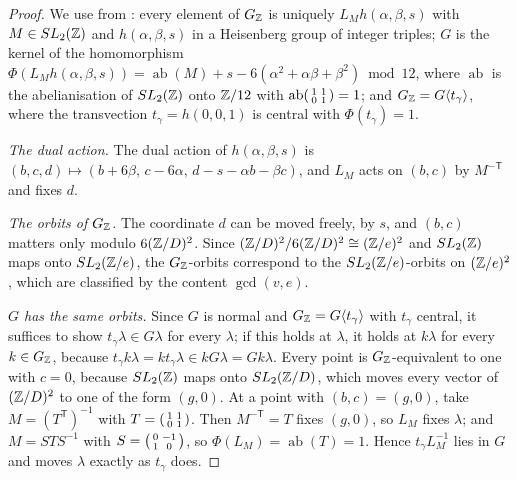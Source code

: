 \begin{proof}
We use from \cite[§§2--3]{SixSpherePaper}: every element of $G_{\mathbb{Z}}$ is uniquely $L_Mh(\alpha,\beta,s)$ with $M\in SL_2(\mathbb{Z})$ and $h(\alpha,\beta,s)$ in a Heisenberg group of integer triples; $G$ is the kernel of the homomorphism $\Phi(L_Mh(\alpha,\beta,s))=\operatorname{ab}(M)+s-6(\alpha^2+\alpha\beta+\beta^2)\bmod12$, where $\operatorname{ab}$ is the abelianisation of $SL_2(\mathbb{Z})$ onto $\mathbb{Z}/12$ with $\operatorname{ab}\begin{psmallmatrix}1&1\\0&1\end{psmallmatrix}=1$; and $G_{\mathbb{Z}}=G\langle t_\gamma\rangle$, where the transvection $t_\gamma=h(0,0,1)$ is central with $\Phi(t_\gamma)=1$.

\emph{The dual action.} The dual action of $h(\alpha,\beta,s)$ is $(b,c,d)\mapsto(b+6\beta,\,c-6\alpha,\,d-s-\alpha b-\beta c)$, and $L_M$ acts on $(b,c)$ by $M^{-\mathsf T}$ and fixes $d$.

\emph{The orbits of $G_{\mathbb{Z}}$.} The coordinate $d$ can be moved freely, by $s$, and $(b,c)$ matters only modulo $6(\mathbb{Z}/D)^2$. Since $(\mathbb{Z}/D)^2/6(\mathbb{Z}/D)^2\cong(\mathbb{Z}/e)^2$ and $SL_2(\mathbb{Z})$ maps onto $SL_2(\mathbb{Z}/e)$, the $G_{\mathbb{Z}}$-orbits correspond to the $SL_2(\mathbb{Z}/e)$-orbits on $(\mathbb{Z}/e)^2$, which are classified by the content $\gcd(v,e)$.

\emph{$G$ has the same orbits.} Since $G$ is normal and $G_{\mathbb{Z}}=G\langle t_\gamma\rangle$ with $t_\gamma$ central, it suffices to show $t_\gamma\lambda\in G\lambda$ for every $\lambda$; if this holds at $\lambda$, it holds at $k\lambda$ for every $k\in G_{\mathbb{Z}}$, because $t_\gamma k\lambda=kt_\gamma\lambda\in kG\lambda=Gk\lambda$. Every point is $G_{\mathbb{Z}}$-equivalent to one with $c=0$, because $SL_2(\mathbb{Z})$ maps onto $SL_2(\mathbb{Z}/D)$, which moves every vector of $(\mathbb{Z}/D)^2$ to one of the form $(g,0)$. At a point with $(b,c)=(g,0)$, take $M=(T^{\mathsf T})^{-1}$ with $T=\begin{psmallmatrix}1&1\\0&1\end{psmallmatrix}$. Then $M^{-\mathsf T}=T$ fixes $(g,0)$, so $L_M$ fixes $\lambda$; and $M=ST S^{-1}$ with $S=\begin{psmallmatrix}0&-1\\1&0\end{psmallmatrix}$, so $\Phi(L_M)=\operatorname{ab}(T)=1$. Hence $t_\gamma L_M^{-1}$ lies in $G$ and moves $\lambda$ exactly as $t_\gamma$ does.
\end{proof}

